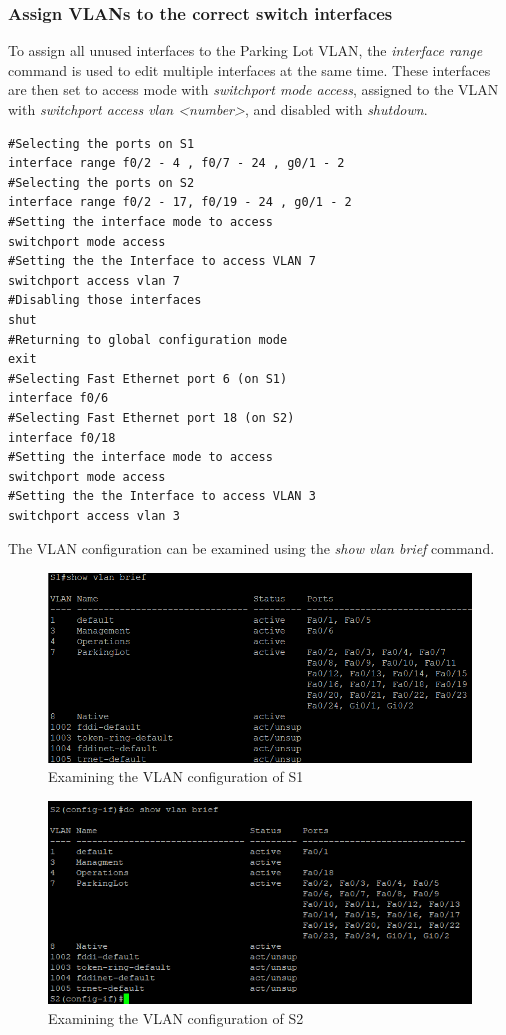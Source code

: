 \documentclass[a4paper]{article}
\newcommand{\ii}{\textit}
\begin{document}
\subsubsection{Assign VLANs to the correct switch interfaces}
To assign all unused interfaces to the Parking Lot VLAN, the \ii{interface range} command is used to edit multiple interfaces at the same time. These interfaces are then set to access mode with \ii{switchport mode access}, assigned to the VLAN with \ii{switchport access vlan <number>}, and disabled with \ii{shutdown}.
\begin{lstlisting}
#Selecting the ports on S1
interface range f0/2 - 4 , f0/7 - 24 , g0/1 - 2	
#Selecting the ports on S2
interface range f0/2 - 17, f0/19 - 24 , g0/1 - 2
#Setting the interface mode to access
switchport mode access
#Setting the the Interface to access VLAN 7
switchport access vlan 7
#Disabling those interfaces
shut
#Returning to global configuration mode
exit
#Selecting Fast Ethernet port 6 (on S1)
interface f0/6
#Selecting Fast Ethernet port 18 (on S2)
interface f0/18
#Setting the interface mode to access
switchport mode access
#Setting the the Interface to access VLAN 3
switchport access vlan 3
\end{lstlisting}
The VLAN configuration can be examined using the \ii{show vlan brief} command.
\begin{figure}[h]
	\includegraphics[scale=0.4]{images/s1_show_vlan_brief.png}
	\centering
	\caption{Examining the VLAN configuration of S1}
\end{figure}
\begin{figure}[h]
	\includegraphics[scale=0.37]{images/s2_show_vlan_brief.png}
	\centering
	\caption{Examining the VLAN configuration of S2}
\end{figure}
\end{document}
